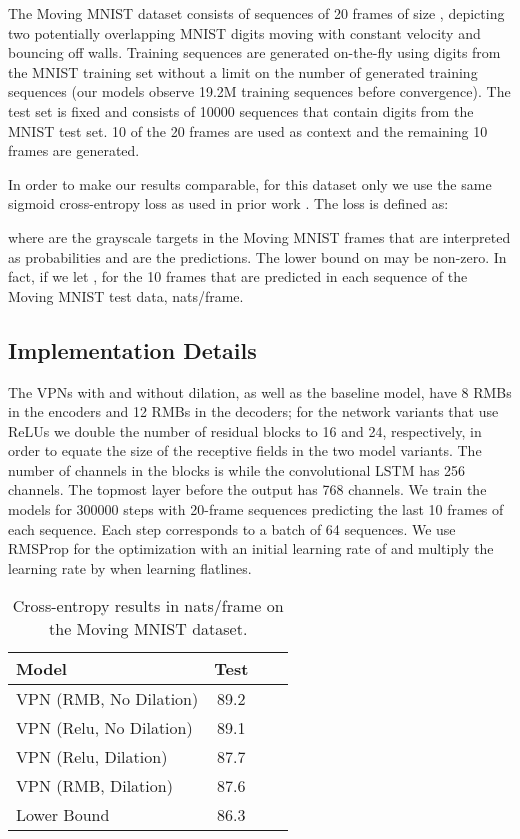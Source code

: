 \documentclass{article}
\begin{document}
The Moving MNIST dataset consists of sequences of 20 frames of size , depicting two potentially overlapping MNIST digits moving with constant velocity and bouncing off walls. Training sequences are generated on-the-fly using digits from the MNIST training set without a limit on the number of generated training sequences (our models observe 19.2M training sequences before convergence). The test set is fixed and consists of 10000 sequences that contain digits from the MNIST test set. 10 of the 20 frames are used as context and the remaining 10 frames are generated. 

In order to make our results comparable, for this dataset only we use the same sigmoid cross-entropy loss as used in prior work \citep{ICML-2015-SrivastavaMS}. The loss is defined as:

where  are the grayscale targets in the Moving MNIST frames that are interpreted as probabilities and  are the predictions. The lower bound on  may be non-zero. In fact, if we let , for the 10 frames that are predicted in each sequence of the Moving MNIST test data,  nats/frame.


\subsection{Implementation Details}

The VPNs with and without dilation, as well as the baseline model, have 8 RMBs in the encoders and 12 RMBs in the decoders; for the network variants that use ReLUs we double the number of residual blocks to 16 and 24, respectively, in order to equate the size of the receptive fields in the two model variants. The number of channels in the blocks is  while the convolutional LSTM has 256 channels. The topmost layer before the output has 768 channels. We train the models for 300000 steps with 20-frame sequences predicting the last 10 frames of each sequence.  Each step corresponds to a batch of 64 sequences. We use RMSProp for the optimization with an initial learning rate of  and multiply the learning rate by  when learning flatlines.  

\begin{table}[t]
\small
  \begin{center}
  \begin{tabular}{lccc}
    \toprule
    \textbf{Model} &  \textbf{Test}  \\ \midrule
      {VPN (RMB, No Dilation)} &  89.2 \\ 
      {VPN (Relu, No Dilation)} &  89.1 \\ 
      {VPN (Relu, Dilation)} &  87.7 \\ 
      {{VPN (RMB, Dilation)}} &  87.6 \\ \midrule
      {Lower Bound} & 86.3  \\
      \bottomrule
  \end{tabular}
  \end{center}
\caption{Cross-entropy results in nats/frame on the Moving MNIST dataset.}
\label{table:dilation}
\end{table}
\end{document}
